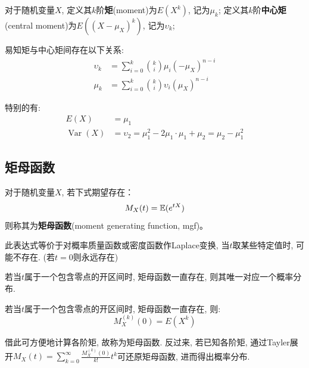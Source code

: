 \begin{definition}
    对于随机变量$X$, 定义其$k$阶\textbf{矩}(moment)为$E(X^k)$, 记为$\mu_k$; 定义其$k$阶\textbf{中心矩}(central moment)为$E((X-\mu_X)^k)$, 记为$\upsilon_k$;
\end{definition}

易知矩与中心矩间存在以下关系:
\begin{align*}
    \upsilon_k & =\sum_{i=0}^k \binom{k}{i} \mu_i (-\mu_X)^{n-i}     \\
    \mu_k      & =\sum_{i=0}^k \binom{k}{i} \upsilon_i (\mu_X)^{n-i}
\end{align*}

特别的有:
\begin{align*}
    E(X)                  & =\mu_1                                                         \\
    \operatorname{Var}(X) & =\upsilon_2=\mu_1^2-2\mu_1 \cdot \mu_1 + \mu_2 = \mu_2-\mu_1^2
\end{align*}

\subsection{矩母函数}

\begin{definition}
    对于随机变量$X$, 若下式期望存在：
    \[ M_X(t) = \mathbb{E}(e^{tX}) \]
    则称其为\textbf{矩母函数}(moment generating function, mgf)。
\end{definition}

\begin{remark}
    此表达式等价于对概率质量函数或密度函数作Laplace变换, 当$t$取某些特定值时, 可能不存在. (若$t=0$则永远存在)
\end{remark}

\begin{theorem}
    若当$t$属于一个包含零点的开区间时, 矩母函数一直存在, 则其唯一对应一个概率分布.
\end{theorem}

\begin{theorem}
    若当$t$属于一个包含零点的开区间时, 矩母函数一直存在, 则:
    \[ M_X^{(k)}(0) = E(X^k) \]
\end{theorem}

\begin{remark}
    借此可方便地计算各阶矩, 故称为矩母函数. 反过来, 若已知各阶矩, 通过Tayler展开$M_X(t)=\sum_{k=0}^{\infty}\frac{M_X^{(k)}(0)}{k!}t^k$可还原矩母函数, 进而得出概率分布.
\end{remark}

